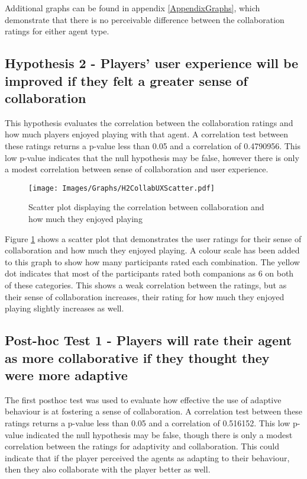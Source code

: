 \documentclass{IEEEtran}
\begin{document}
Additional graphs can be found in appendix \ref{AppendixGraphs}, which demonstrate that there is no perceivable difference between the collaboration ratings for either agent type.

\subsection{Hypothesis 2 - Players' user experience will be improved if they felt a greater sense of collaboration}


This hypothesis evaluates the correlation between the collaboration ratings and how much players enjoyed playing with that agent. A correlation test between these ratings returns a p-value less than 0.05 and a correlation of 0.4790956. This low p-value indicates that the null hypothesis may be false, however there is only a modest correlation between sense of collaboration and user experience.

\begin{figure}[!h]
  \centering
  \texttt{[image: Images/Graphs/H2CollabUXScatter.pdf]}
  
\caption{Scatter plot displaying the correlation between collaboration and how much they enjoyed playing}
\label{fig:H2CollabUXScatter}
\end{figure}

Figure \ref{fig:H2CollabUXScatter} shows a scatter plot that demonstrates the user ratings for their sense of collaboration and how much they enjoyed playing. A colour scale has been added to this graph to show how many participants rated each combination. The yellow dot indicates that most of the participants rated both companions as 6 on both of these categories. This shows a weak correlation between the ratings, but as their sense of collaboration increases, their rating for how much they enjoyed playing slightly increases as well.

\subsection{Post-hoc Test 1 - Players will rate their agent as more collaborative if they thought they were more adaptive}

The first posthoc test was used to evaluate how effective the use of adaptive behaviour is at fostering a sense of collaboration. A correlation test between these ratings returns a p-value less than 0.05 and a correlation of 0.516152. This low p-value indicated the null hypothesis may be false, though there is only a modest correlation between the ratings for adaptivity and collaboration. This could indicate that if the player perceived the agents as adapting to their behaviour, then they also collaborate with the player better as well.
\end{document}
